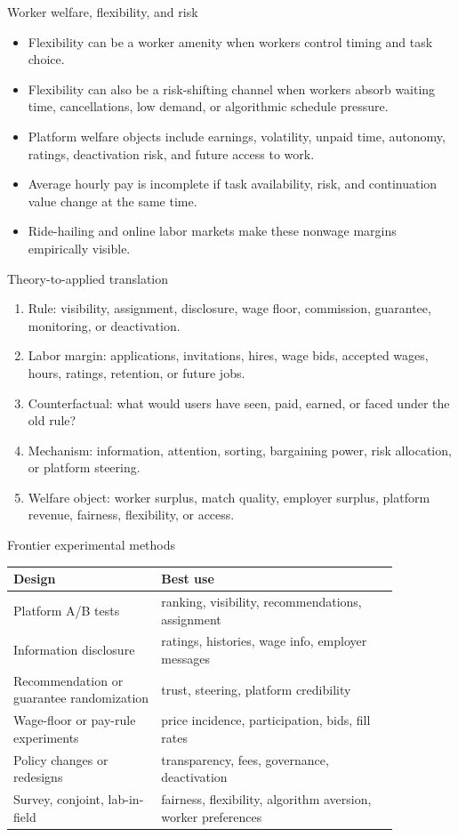 \documentclass[aspectratio=169,11pt]{beamer}
\begin{document}
\begin{frame}{Worker welfare, flexibility, and risk}
\begin{itemize}
    \item Flexibility can be a worker amenity when workers control timing and task choice.
    \item Flexibility can also be a risk-shifting channel when workers absorb waiting time, cancellations, low demand, or algorithmic schedule pressure.
    \item Platform welfare objects include earnings, volatility, unpaid time, autonomy, ratings, deactivation risk, and future access to work.
    \item Average hourly pay is incomplete if task availability, risk, and continuation value change at the same time.
    \item Ride-hailing and online labor markets make these nonwage margins empirically visible.
\end{itemize}
\end{frame}

\begin{frame}{Theory-to-applied translation}
\small
\begin{enumerate}
    \item Rule: visibility, assignment, disclosure, wage floor, commission, guarantee, monitoring, or deactivation.
    \item Labor margin: applications, invitations, hires, wage bids, accepted wages, hours, ratings, retention, or future jobs.
    \item Counterfactual: what would users have seen, paid, earned, or faced under the old rule?
    \item Mechanism: information, attention, sorting, bargaining power, risk allocation, or platform steering.
    \item Welfare object: worker surplus, match quality, employer surplus, platform revenue, fairness, flexibility, or access.
\end{enumerate}
\end{frame}

\begin{frame}{Frontier experimental methods}
\small
\begin{tabular}{p{0.33\linewidth} p{0.53\linewidth}}
\toprule
Design & Best use \\
\midrule
Platform A/B tests & ranking, visibility, recommendations, assignment \\
Information disclosure & ratings, histories, wage info, employer messages \\
Recommendation or guarantee randomization & trust, steering, platform credibility \\
Wage-floor or pay-rule experiments & price incidence, participation, bids, fill rates \\
Policy changes or redesigns & transparency, fees, governance, deactivation \\
Survey, conjoint, lab-in-field & fairness, flexibility, algorithm aversion, worker preferences \\
\bottomrule
\end{tabular}
\end{frame}
\end{document}
